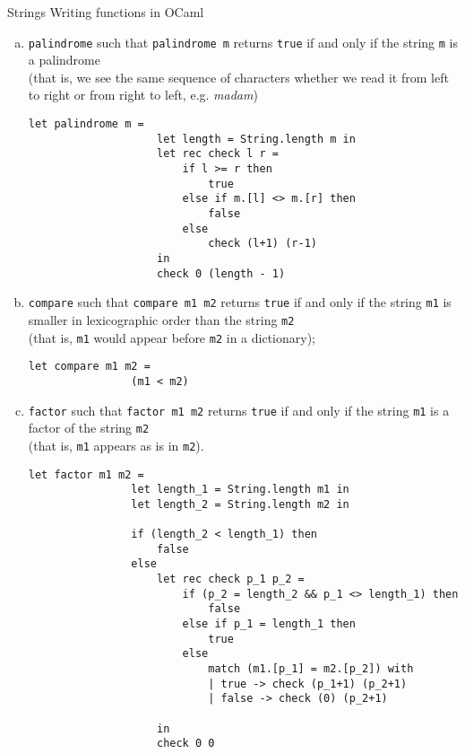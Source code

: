 \begin{problem}{Strings}{}
    Writing functions in OCaml
    \begin{enumerate}[(a)]
        \item \lstinline|palindrome| such that \lstinline|palindrome m| returns \lstinline|true| if and only if the string \lstinline|m| is a palindrome\\
        (that is, we see the same sequence of characters whether we read it from left to right
        or from right to left, e.g. \textit{madam})
        \begin{lstlisting}[style=caml]
                let palindrome m =
                    let length = String.length m in
                    let rec check l r =
                        if l >= r then
                            true
                        else if m.[l] <> m.[r] then
                            false
                        else 
                            check (l+1) (r-1)
                    in 
                    check 0 (length - 1)
        \end{lstlisting}


        \item \lstinline|compare| such that \lstinline|compare m1 m2| returns \lstinline|true| if and only if the string \lstinline|m1| is smaller in lexicographic order than the string \lstinline|m2|\\ 
        (that is, \lstinline|m1| would appear before \lstinline|m2| in a dictionary);

        \begin{lstlisting}[style=caml]
            let compare m1 m2 = 
                (m1 < m2)
        \end{lstlisting}

        \item \lstinline|factor| such that \lstinline|factor m1 m2| returns \lstinline|true| if and only if the string \lstinline|m1| is a factor of the string \lstinline|m2|\\ 
        (that is, \lstinline|m1| appears as is in \lstinline|m2|).

        \begin{lstlisting}[style=caml]
            let factor m1 m2 =
                let length_1 = String.length m1 in
                let length_2 = String.length m2 in

                if (length_2 < length_1) then
                    false
                else
                    let rec check p_1 p_2 =
                        if (p_2 = length_2 && p_1 <> length_1) then 
                            false
                        else if p_1 = length_1 then
                            true
                        else
                            match (m1.[p_1] = m2.[p_2]) with
                            | true -> check (p_1+1) (p_2+1)
                            | false -> check (0) (p_2+1)
                            
                    in 
                    check 0 0
        \end{lstlisting}

    \end{enumerate}
\end{problem}


